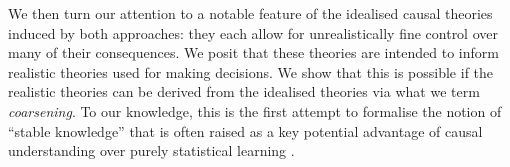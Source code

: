 We then turn our attention to a notable feature of the idealised causal theories induced by both approaches: they each allow for unrealistically fine control over many of their consequences. We posit that these theories are intended to inform realistic theories used for making decisions. We show that this is possible if the realistic theories can be derived from the idealised theories via what we term \emph{coarsening}. To our knowledge, this is the first attempt to formalise the notion of ``stable knowledge'' that is often raised as a key potential advantage of causal understanding over purely statistical learning \citep{arjovsky_invariant_2019,pearl_causality:_2009,rubin_causal_2005}.




